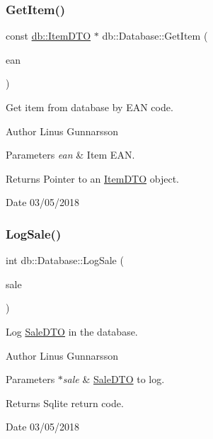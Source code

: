 \subsubsection{\texorpdfstring{Get\+Item()}{GetItem()}}
{\footnotesize\ttfamily const \mbox{\hyperlink{classdb_1_1ItemDTO}{db\+::\+Item\+D\+TO}} $\ast$ db\+::\+Database\+::\+Get\+Item (\begin{DoxyParamCaption}\item[{std\+::string}]{ean }\end{DoxyParamCaption})}

Get item from database by E\+AN code. \begin{DoxyAuthor}{Author}
Linus Gunnarsson 
\end{DoxyAuthor}

\begin{DoxyParams}{Parameters}
{\em ean} & Item E\+AN. \\
\hline
\end{DoxyParams}
\begin{DoxyReturn}{Returns}
Pointer to an \mbox{\hyperlink{classdb_1_1ItemDTO}{Item\+D\+TO}} object. 
\end{DoxyReturn}
\begin{DoxyDate}{Date}
03/05/2018 
\end{DoxyDate}
\mbox{\label{classdb_1_1Database_ac2aef162b74c917acdaf11794422c415}} 
\subsubsection{\texorpdfstring{Log\+Sale()}{LogSale()}}
{\footnotesize\ttfamily int db\+::\+Database\+::\+Log\+Sale (\begin{DoxyParamCaption}\item[{\mbox{\hyperlink{classdb_1_1SaleDTO}{db\+::\+Sale\+D\+TO}} $\ast$}]{sale }\end{DoxyParamCaption})}

Log \mbox{\hyperlink{classdb_1_1SaleDTO}{Sale\+D\+TO}} in the database. \begin{DoxyAuthor}{Author}
Linus Gunnarsson 
\end{DoxyAuthor}

\begin{DoxyParams}{Parameters}
{\em $\ast$sale} & \mbox{\hyperlink{classdb_1_1SaleDTO}{Sale\+D\+TO}} to log. \\
\hline
\end{DoxyParams}
\begin{DoxyReturn}{Returns}
Sqlite return code. 
\end{DoxyReturn}
\begin{DoxyDate}{Date}
03/05/2018 
\end{DoxyDate}
\mbox{\label{classdb_1_1Database_a777611636e84a82dc2bbd2be10491bb7}} 
